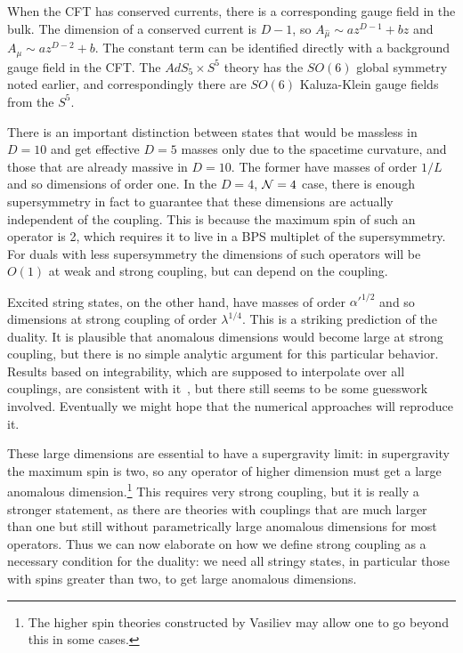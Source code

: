 \documentclass[12pt]{article}
\begin{document}
{When the CFT has conserved currents, there is a corresponding gauge field in the bulk.  The dimension of a conserved current is $D-1$, so $A_{\hat\mu} \sim a z^{D-1} + b z$ and $A_\mu \sim a z^{D-2} + b$.  The constant term can be identified directly with a background gauge field in the \mbox{CFT}.  The $AdS_5 \times S^5$ theory has the $SO(6)$ global symmetry noted earlier, and correspondingly there are $SO(6)$ Kaluza-Klein gauge fields from the $S^5$.

There is an important distinction between states that would be massless in $D=10$ and get effective $D=5$ masses only due to the spacetime curvature, and those that are already massive in $D=10$.  The former have masses of order $1/L$ and so dimensions of order one.  In the $D=4$, ${\cal N} = 4$ case, there is enough supersymmetry in fact to guarantee that these dimensions are actually independent of the coupling.  This is because the maximum spin of such an operator is 2, which requires it to live in a BPS multiplet of the supersymmetry.  For duals with less supersymmetry the dimensions of such operators will be $O(1)$ at weak and strong coupling, but can depend on the coupling. 

Excited string states, on the other hand, have masses of order $\alpha'^{1/2}$ and so dimensions at strong coupling of order $\lambda^{1/4}$.  This is a striking prediction of the duality.  It is plausible that anomalous dimensions would become large at strong coupling, but there is no simple analytic argument for this particular behavior.  Results based on integrability, which are supposed to interpolate over all couplings, are consistent with it~\cite{Gromov:2009zb}, but there still seems to be some guesswork involved.  Eventually we might hope that the numerical approaches will reproduce it.

These large dimensions are essential to have a supergravity limit: in supergravity the maximum spin is two, so any operator of higher dimension must get a large anomalous dimension.\footnote{The higher spin theories constructed by Vasiliev may allow one to go beyond this in some cases.}  This requires very strong coupling, but it is really a stronger statement, as there are theories with couplings that are much larger than one but still without parametrically large anomalous dimensions for most operators.  Thus we can now elaborate on how we define strong coupling as a necessary condition for the duality: we need all stringy states, in particular those with spins greater than two, to get large anomalous dimensions. 

}
\end{document}
